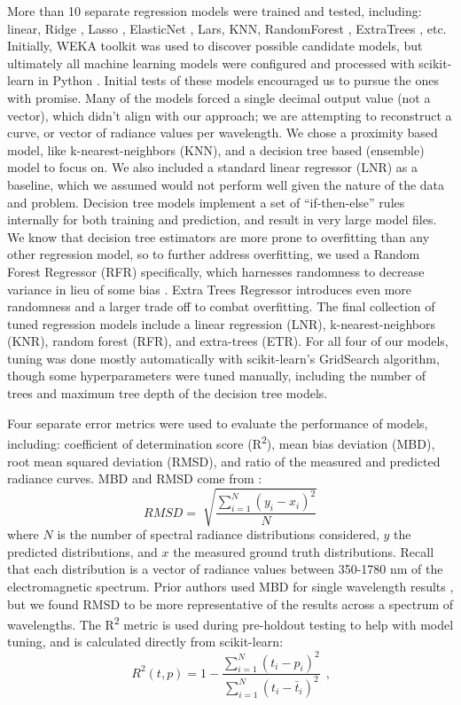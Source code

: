 More than 10 separate regression models were trained and tested, including: linear, Ridge \citep{hoerl_ridge}, Lasso \citep{tibshirani_lasso}, ElasticNet \citep{zou_elastic}, Lars, KNN, RandomForest \citep{kocev_tree}, ExtraTrees \citep{geurts_etr}, etc. Initially, WEKA toolkit \citep{hall_weka} was used to discover possible candidate models, but ultimately all machine learning models were configured and processed with scikit-learn in Python \citep{pedregosa_scikit}. Initial tests of these models encouraged us to pursue the ones with promise. Many of the models forced a single decimal output value (not a vector), which didn't align with our approach; we are attempting to reconstruct a curve, or vector of radiance values per wavelength. We chose a proximity based model, like k-nearest-neighbors (KNN), and a decision tree based (ensemble) model to focus on. We also included a standard linear regressor (LNR) as a baseline, which we assumed would not perform well given the nature of the data and problem. Decision tree models implement a set of ``if-then-else'' rules internally for both training and prediction, and result in very large model files. We know that decision tree estimators are more prone to overfitting than any other regression model, so to further address overfitting, we used a Random Forest Regressor (RFR) specifically, which harnesses randomness to decrease variance in lieu of some bias \citep{kocev_tree}. Extra Trees Regressor \citep{geurts_etr} introduces even more randomness and a larger trade off to combat overfitting. The final collection of tuned regression models include a linear regression (LNR), k-nearest-neighbors (KNR), random forest (RFR), and extra-trees (ETR). For all four of our models, tuning was done mostly automatically with scikit-learn's GridSearch algorithm, though some hyperparameters were tuned manually, including the number of trees and maximum tree depth of the decision tree models.

Four separate error metrics were used to evaluate the performance of models, including: coefficient of determination score (R\textsuperscript{2}), mean bias deviation (MBD), root mean squared deviation (RMSD), and ratio of the measured and predicted radiance curves. MBD and RMSD come from \citet{iqbal_intro}:
\begin{equation}
\label{eq:rmsd}
RMSD=\sqrt[]{\frac{\sum_{i=1}^{N} (y_i-x_i)^2}{N}}
\end{equation}
where $N$ is the number of spectral radiance distributions considered, $y$ the predicted distributions, and $x$ the measured ground truth distributions. Recall that each distribution is a vector of radiance values between 350-1780 nm of the electromagnetic spectrum. Prior authors used MBD for single wavelength results \citep{cazorla_using_2008, tohsing_validation_2014}, but we found RMSD to be more representative of the results across a spectrum of wavelengths. The R\textsuperscript{2} metric is used during pre-holdout testing to help with model tuning, and is calculated directly from scikit-learn:
\begin{equation}
\label{eq:r2}
R^2(t,p) = 1 - \frac{\sum_{i=1}^{N} (t_i-p_i)^2} {\sum_{i=1}^{N} (t_i-\bar{t}_i)^2} ~~\textrm{,}
\end{equation}

